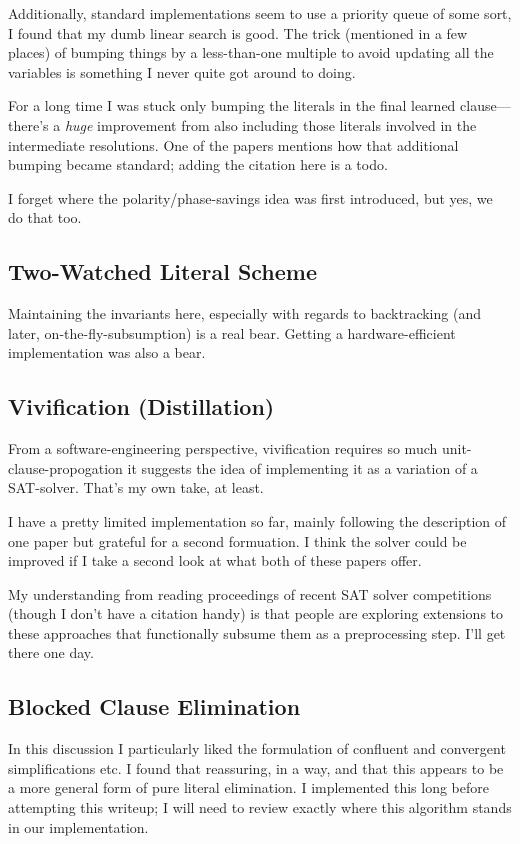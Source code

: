 \documentclass{article}
\begin{document}
Additionally, standard implementations seem to use a priority queue of some sort, I found that my dumb linear search is good.
The trick (mentioned in a few places\cite{knuth2015,bierefrohlich2015}) of bumping things by a less-than-one multiple to avoid updating all the variables is something I never quite got around to doing.

For a long time I was stuck only bumping the literals in the final learned clause---there's a \emph{huge} improvement from also including those literals involved in the intermediate resolutions.
One of the papers mentions how that additional bumping became standard; adding the citation here is a todo.

I forget where the polarity/phase-savings idea was first introduced, but yes, we do that too.

\subsection{Two-Watched Literal Scheme}
Maintaining the invariants here, especially with regards to backtracking (and later, on-the-fly-subsumption) is a real bear.
Getting a hardware-efficient implementation was also a bear.

\subsection{Vivification (Distillation)}
From a software-engineering perspective, vivification requires so much unit-clause-propogation it suggests the idea of implementing it as a variation of a SAT-solver.
That's my own take, at least.

I have a pretty limited implementation so far, mainly following the description of one paper\cite{piettehamadisais2008} but grateful for a second formuation\cite{hansomenzi2007}.
I think the solver could be improved if I take a second look at what both of these papers offer.

My understanding from reading proceedings of recent SAT solver competitions (though I don't have a citation handy) is that people are exploring extensions to these approaches that functionally subsume them as a preprocessing step.
I'll get there one day.
\subsection{Blocked Clause Elimination}
In this discussion\cite{jarvisalobiereheule2010} I particularly liked the formulation of confluent and convergent simplifications etc.
I found that reassuring, in a way, and that this appears to be a more general form of pure literal elimination.
I implemented this long before attempting this writeup; I will need to review exactly where this algorithm stands in our implementation.
\end{document}
